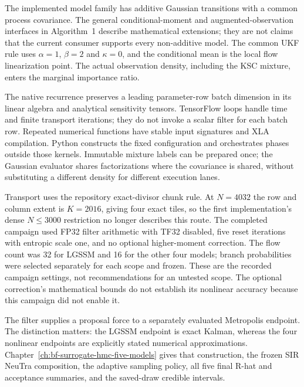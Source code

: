 The implemented model family has additive Gaussian transitions with a common
process covariance. The general conditional-moment and augmented-observation
interfaces in Algorithm~1 describe mathematical extensions; they are not claims
that the current consumer supports every non-additive model. The common UKF
rule uses $\alpha=1$, $\beta=2$ and $\kappa=0$, and the conditional mean is the
local flow linearization point. The actual observation density, including the
KSC mixture, enters the marginal importance ratio.

The native recurrence preserves a leading parameter-row batch dimension in
its linear algebra and analytical sensitivity tensors. TensorFlow loops handle
time and finite transport iterations; they do not invoke a scalar filter for
each batch row. Repeated numerical functions have stable input signatures and
XLA compilation. Python constructs the fixed configuration and orchestrates
phases outside those kernels. Immutable mixture labels can be prepared once;
the Gaussian evaluator shares factorizations where the covariance is shared,
without substituting a different density for different execution lanes.

Transport uses the repository exact-divisor chunk rule. At $N=4032$ the row
and column extent is $K=2016$, giving four exact tiles, so the first
implementation's dense $N\leq3000$ restriction no longer describes this route.
The completed campaign used FP32 filter arithmetic with TF32 disabled, five
reset iterations with entropic scale one, and no optional higher-moment
correction. The flow count was 32 for LGSSM and 16 for the other four models;
branch probabilities were selected separately for each scope and frozen.
These are the recorded campaign settings, not recommendations for an untested
scope. The optional correction's mathematical bounds do not establish its
nonlinear accuracy because this campaign did not enable it.

The filter supplies a proposal force to a separately evaluated Metropolis
endpoint. The distinction matters: the LGSSM endpoint is exact Kalman, whereas
the four nonlinear endpoints are explicitly stated numerical approximations.
Chapter~\ref{ch:bf-surrogate-hmc-five-models} gives that construction, the
frozen SIR NeuTra composition, the adaptive sampling policy, all five final
R-hat and acceptance summaries, and the saved-draw credible intervals.
